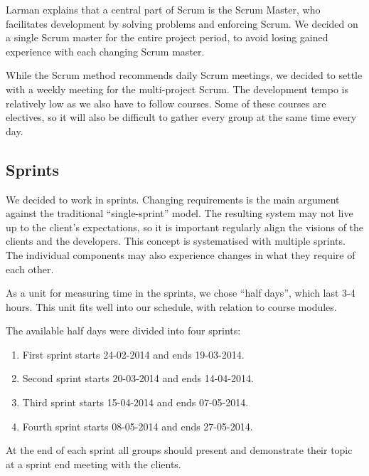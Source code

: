 Larman \cite{larmanAgile} explains that a central part of Scrum is the Scrum Master, who facilitates development by solving problems and enforcing Scrum. We decided on a single Scrum master for the entire project period, to avoid losing gained experience with each changing Scrum master.

While the Scrum method recommends daily Scrum meetings, we decided to settle with a weekly meeting for the multi-project Scrum. The development tempo is relatively low as we also have to follow courses. Some of these courses are electives, so it will also be difficult to gather every group at the same time every day.

\subsection{Sprints}
We decided to work in sprints. Changing requirements is the main argument against the traditional ``single-sprint'' model. The resulting system may not live up to the client's expectations, so it is important regularly align the visions of the clients and the developers. This concept is systematised with multiple sprints. The individual components may also experience changes in what they require of each other.

As a unit for measuring time in the sprints, we chose ``half days'', which last 3-4 hours. This unit fits well into our schedule, with relation to course modules.

The available half days were divided into four sprints:

\begin{enumerate}
\item First sprint starts 24-02-2014 and ends 19-03-2014.
\item Second sprint starts 20-03-2014 and ends 14-04-2014.
\item Third sprint starts 15-04-2014 and ends 07-05-2014.
\item Fourth sprint starts 08-05-2014 and ends 27-05-2014.
\end{enumerate}

At the end of each sprint all groups should present and demonstrate their topic at a sprint end meeting with the clients.
